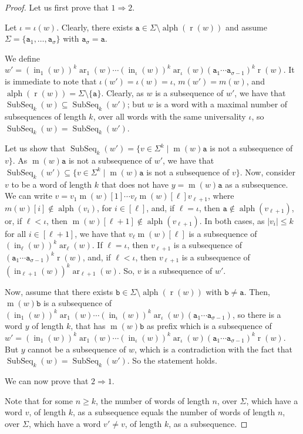 \documentclass[runningheads,UKenglish,cleveref, autoref, thm-restate]{llncs}
\def\ta{\mathtt{a}}
\def\tb{\mathtt{b}}
\def\r{\operatorname{r}}
\def\m{\operatorname{m}}
\DeclareMathOperator{\ar}{ar}
\DeclareMathOperator{\al}{alph}
\DeclareMathOperator\ScatFact{SubSeq}
\DeclareMathOperator{\inner}{in}
\newif\ifpaper
\begin{document}
\ifpaper
\else
\begin{proof}
Let us first prove that $1\Rightarrow 2$. 

Let $\iota=\iota(w)$. Clearly, there exists $\ta\in \Sigma\setminus \al(\r(w))$ and assume $\Sigma=\{\ta_1,\ldots,\ta_\sigma\}$ with $\ta_\sigma=\ta$. 

We define $w' = (\inner_1(w))^k\ar_1(w) \cdots (\inner_\iota(w))^k\ar_\iota(w) (\ta_1\cdots \ta_{\sigma-1})^k\r(w)$. It is immediate to note that $\iota(w')=\iota(w)=\iota$, $m(w')=m(w)$, and $\al(\r(w))=\Sigma\setminus \{\ta\}$. Clearly, as $w$ is a subsequence of $w'$, we have that $\ScatFact_k(w)\subseteq \ScatFact_k(w')$; but $w$ is a word with a maximal number of subsequences of length $k$, over all words with the same universality $\iota$, so $\ScatFact_k(w)= \ScatFact_k(w')$. 

Let us show that $\ScatFact_k(w')=\{v\in \Sigma^k\mid \m(w)\ta$ is not a subsequence of $v\}$. As $\m(w)\ta$ is not a subsequence of $w'$, we have that $\ScatFact_k(w')\subseteq \{v\in \Sigma^k\mid \m(w)\ta$ is not a subsequence of $v\}$. Now, consider $v$ to be a word of length $k$ that does not have $y=\m(w)\ta$ as a subsequence. We can write $v= v_1 \m(w)[1] \cdots v_\ell \m(w)[\ell] v_{\ell+1}$, where $m(w)[i] \notin \al(v_i)$, for $i\in [\ell]$, and, if $\ell=\iota$, then $\ta \notin \al(v_{\ell+1})$, or, if $\ell < \iota$, then $\m(w)[\ell+1] \notin \al(v_{\ell+1})$. In both cases, as $|v_i|\leq k$ for all $i\in [\ell+1]$, we have that $v_\ell \m(w)[\ell]$ is a subsequence of $(\inner_\ell(w))^k\ar_\ell(w)$. If $\ell=\iota$, then $v_{\ell+1}$ is a subsequence of $(\ta_1\cdots \ta_{\sigma-1})^k\r(w)$, and, if $\ell < \iota$, then $v_{\ell+1}$ is a subsequence of $(\inner_{\ell+1}(w))^k\ar_{\ell+1}(w)$. So, $v$ is a subsequence of $w'$. 

Now, assume that there exists $\tb\in \Sigma\setminus \al(\r(w))$ with $\tb\neq \ta$. Then, $\m(w)\tb$ is a subsequence of $(\inner_1(w))^k\ar_1(w) \cdots (\inner_\iota(w))^k\ar_\iota(w) (\ta_1\cdots \ta_{\sigma-1})$, so there is a word $y$ of length $k$, that has $\m(w)\tb$ as prefix which is a subsequence of $w' = (\inner_1(w))^k\ar_1(w) \cdots (\inner_\iota(w))^k\ar_\iota(w) (\ta_1\cdots \ta_{\sigma-1})^k\r(w)$. But $y$ cannot be a subsequence of $w$, which is a contradiction with the fact that $\ScatFact_k(w)= \ScatFact_k(w')$. So the statement holds. 

We can now prove that $2\Rightarrow 1$. 

Note that for some $n\geq k$, the number of words of length $n$, over $\Sigma$, which have a word $v$, of length $k$, as a subsequence equals the number of words of length $n$, over $\Sigma$, which have a word $v'\neq v$, of length $k$, as a subsequence. 


\end{proof}
\end{document}
